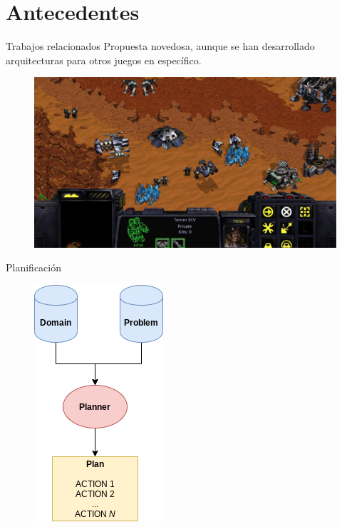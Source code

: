 \documentclass[11pt]{beamer}    %
\begin{document}
    \section{Antecedentes}

    \begin{frame}{Trabajos relacionados}
        Propuesta \alert{novedosa}, aunque se han desarrollado arquitecturas para otros
        juegos en específico.

        \begin{figure}
            \centering
            \includegraphics[scale=0.25]{img/presentation/starcraft}
        \end{figure}
    \end{frame}

    \begin{frame}{Planificación}
        \begin{figure}
            \centering
            \includegraphics[scale=0.4]{img/presentation/planning}
        \end{figure}
    \end{frame}
\end{document}
